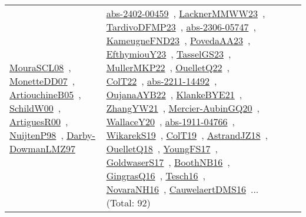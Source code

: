 {\begin{longtable}{lp{3cm}>{\raggedright\arraybackslash}p{6cm}>{\raggedright\arraybackslash}p{6cm}>{\raggedright\arraybackslash}p{8cm}}
\href{papers/MouraSCL08.pdf}{MouraSCL08}~\cite{MouraSCL08}, \href{papers/MonetteDD07.pdf}{MonetteDD07}~\cite{MonetteDD07}, \href{papers/ArtiouchineB05.pdf}{ArtiouchineB05}~\cite{ArtiouchineB05}, \href{articles/SchildW00.pdf}{SchildW00}~\cite{SchildW00}, \href{articles/ArtiguesR00.pdf}{ArtiguesR00}~\cite{ArtiguesR00}, \href{articles/NuijtenP98.pdf}{NuijtenP98}~\cite{NuijtenP98}, \href{articles/Darby-DowmanLMZ97.pdf}{Darby-DowmanLMZ97}~\cite{Darby-DowmanLMZ97} & \href{articles/abs-2402-00459.pdf}{abs-2402-00459}~\cite{abs-2402-00459}, \href{articles/LacknerMMWW23.pdf}{LacknerMMWW23}~\cite{LacknerMMWW23}, \href{papers/TardivoDFMP23.pdf}{TardivoDFMP23}~\cite{TardivoDFMP23}, \href{articles/abs-2306-05747.pdf}{abs-2306-05747}~\cite{abs-2306-05747}, \href{papers/KameugneFND23.pdf}{KameugneFND23}~\cite{KameugneFND23}, \href{papers/PovedaAA23.pdf}{PovedaAA23}~\cite{PovedaAA23}, \href{papers/EfthymiouY23.pdf}{EfthymiouY23}~\cite{EfthymiouY23}, \href{papers/TasselGS23.pdf}{TasselGS23}~\cite{TasselGS23}, \href{articles/MullerMKP22.pdf}{MullerMKP22}~\cite{MullerMKP22}, \href{papers/OuelletQ22.pdf}{OuelletQ22}~\cite{OuelletQ22}, \href{articles/ColT22.pdf}{ColT22}~\cite{ColT22}, \href{articles/abs-2211-14492.pdf}{abs-2211-14492}~\cite{abs-2211-14492}, \href{papers/OujanaAYB22.pdf}{OujanaAYB22}~\cite{OujanaAYB22}, \href{papers/KlankeBYE21.pdf}{KlankeBYE21}~\cite{KlankeBYE21}, \href{articles/ZhangYW21.pdf}{ZhangYW21}~\cite{ZhangYW21}, \href{papers/Mercier-AubinGQ20.pdf}{Mercier-AubinGQ20}~\cite{Mercier-AubinGQ20}, \href{articles/WallaceY20.pdf}{WallaceY20}~\cite{WallaceY20}, \href{articles/abs-1911-04766.pdf}{abs-1911-04766}~\cite{abs-1911-04766}, \href{articles/WikarekS19.pdf}{WikarekS19}~\cite{WikarekS19}, \href{papers/ColT19.pdf}{ColT19}~\cite{ColT19}, \href{papers/AstrandJZ18.pdf}{AstrandJZ18}~\cite{AstrandJZ18}, \href{papers/OuelletQ18.pdf}{OuelletQ18}~\cite{OuelletQ18}, \href{papers/YoungFS17.pdf}{YoungFS17}~\cite{YoungFS17}, \href{papers/GoldwaserS17.pdf}{GoldwaserS17}~\cite{GoldwaserS17}, \href{papers/BoothNB16.pdf}{BoothNB16}~\cite{BoothNB16}, \href{papers/GingrasQ16.pdf}{GingrasQ16}~\cite{GingrasQ16}, \href{papers/Tesch16.pdf}{Tesch16}~\cite{Tesch16}, \href{articles/NovaraNH16.pdf}{NovaraNH16}~\cite{NovaraNH16}, \href{papers/CauwelaertDMS16.pdf}{CauwelaertDMS16}~\cite{CauwelaertDMS16}... (Total: 92)\\

\end{longtable}}
